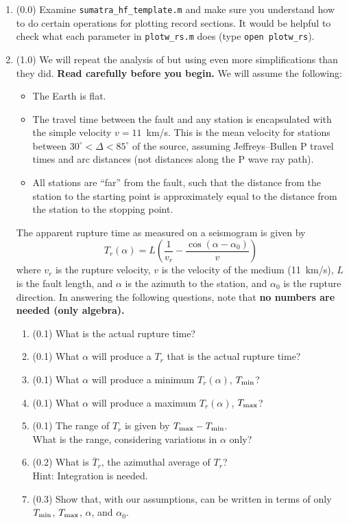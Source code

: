 \documentclass[11pt,titlepage,fleqn]{article}
\begin{document}
\begin{enumerate}
\item (0.0) Examine \verb+sumatra_hf_template.m+ and make sure you understand how to do certain operations for plotting record sections. It would be helpful to check what each parameter in \verb+plotw_rs.m+ does (type \verb+open plotw_rs+).

\item (1.0) We will repeat the analysis of \citet{Ni2005} but using even more simplifications than they did. {\bf Read \citet{Ni2005} carefully before you begin.} We will assume the following:
%
\begin{itemize}
\item The Earth is flat.
\item The travel time between the fault and any station is encapsulated with the simple velocity $v = 11$~km/s. This is the mean velocity for stations between $30^\circ < \Delta < 85^\circ$ of the source, assuming Jeffreys--Bullen P travel times and arc distances (not distances along the P wave ray path).
\item All stations are ``far'' from the fault, such that the distance from the station to the starting point is approximately equal to the distance from the station to the stopping point.
\end{itemize}
%
The apparent rupture time as measured on a seismogram is given by \citep[][Section 4.3.2]{SteinWysession}
%
\begin{equation}
T_r(\alpha) = L\left(\frac{1}{v_r} - \frac{\cos(\alpha-\alpha_0)}{v}\right)
\label{Tr}
\end{equation}
%
where $v_r$ is the rupture velocity, $v$ is the velocity of the medium (11~km/s), $L$ is the fault length, and $\alpha$ is the azimuth to the station, and $\alpha_0$ is the rupture direction. In answering the following questions, note that {\bf no numbers are needed (only algebra).}
%
\begin{enumerate}
\item (0.1) What is the actual rupture time?
\item (0.1) What $\alpha$ will produce a $T_r$ that is the actual rupture time?
\item (0.1) What $\alpha$ will produce a minimum $T_r(\alpha)$, $T_{\rm min}$?
\item (0.1) What $\alpha$ will produce a maximum $T_r(\alpha)$, $T_{\rm max}$?
\item (0.1) The range of $T_r$ is given by $T_{\rm max} - T_{\rm min}$. \\
What is the range, considering variations in $\alpha$ only?
\item (0.2) What is $\overline{T}_r$, the azimuthal average of $T_r$? \\
Hint: Integration is needed.
\item (0.3) Show that, with our assumptions,  can be written in terms of only $T_{\rm min}$, $T_{\rm max}$, $\alpha$, and $\alpha_0$.


\end{enumerate}
\end{enumerate}
\end{document}
